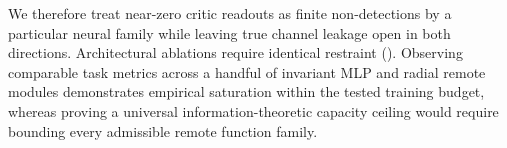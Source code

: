 We therefore treat near-zero critic readouts as finite non-detections by a
particular neural family while leaving true channel leakage open in both
directions. Architectural ablations require identical restraint
(). Observing comparable task metrics across a handful of
invariant MLP and radial remote modules demonstrates empirical saturation
within the tested training budget, whereas proving a universal
information-theoretic capacity ceiling would require bounding every
admissible remote function family.
